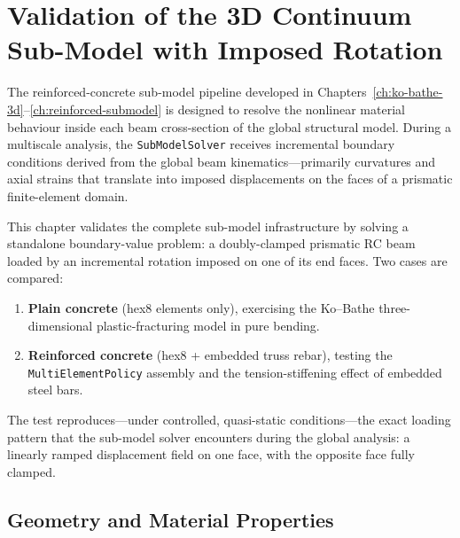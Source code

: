 
\chapter{Validation of the 3D Continuum Sub-Model with Imposed Rotation}
\label{ch:rc-beam-validation}

The reinforced-concrete sub-model pipeline developed in
Chapters~\ref{ch:ko-bathe-3d}--\ref{ch:reinforced-submodel} is designed
to resolve the nonlinear material behaviour inside each beam cross-section
of the global structural model.  During a multiscale analysis, the
\texttt{SubModelSolver} receives incremental boundary conditions derived
from the global beam kinematics---primarily curvatures and axial strains
that translate into imposed displacements on the faces of a prismatic
finite-element domain.

This chapter validates the complete sub-model infrastructure by solving a
standalone boundary-value problem: a doubly-clamped prismatic RC beam
loaded by an incremental rotation imposed on one of its end faces.  Two
cases are compared:

\begin{enumerate}
  \item[\textbf{Case A.}] \textbf{Plain concrete} (hex8 elements only),
        exercising the Ko--Bathe three-dimensional plastic-fracturing
        model in pure bending.
  \item[\textbf{Case B.}] \textbf{Reinforced concrete} (hex8 + embedded
        truss rebar), testing the \texttt{MultiElementPolicy} assembly
        and the tension-stiffening effect of embedded steel bars.
\end{enumerate}

The test reproduces---under controlled, quasi-static conditions---the
exact loading pattern that the sub-model solver encounters during the
global analysis: a linearly ramped displacement field on one face,
with the opposite face fully clamped.


\section{Geometry and Material Properties}
\label{sec:rcbeam-geometry}

